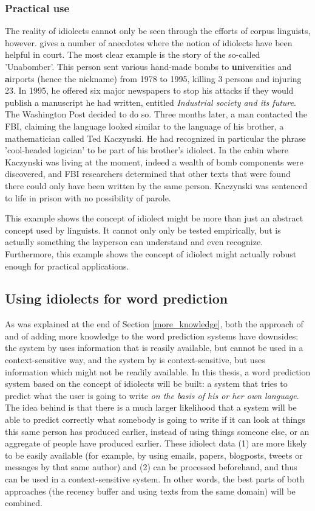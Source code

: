 \documentclass[11pt]{article}
\begin{document}
\subsubsection{Practical use}
The reality of idiolects cannot only be seen through the efforts of corpus linguists, however.  gives a number of anecdotes where the notion of idiolects have been helpful in court. The most clear example is the story of the so-called 'Unabomber'. This person sent various hand-made bombs to \textbf{un}iversities and \textbf{a}irports (hence the nickname) from 1978 to 1995, killing 3 persons and injuring 23. In 1995, he offered six major newspapers to stop his attacks if they would publish a manuscript he had written, entitled \emph{Industrial society and its future}. The Washington Post decided to do so. Three months later, a man contacted the FBI, claiming the language looked similar to the language of his brother, a mathematician called Ted Kaczynski. He had recognized in particular the phrase 'cool-headed logician' to be part of his brother's idiolect. In the cabin where Kaczynski was living at the moment, indeed a wealth of bomb components were discovered, and FBI researchers determined that other texts that were found there could only have been written by the same person. Kaczynski was sentenced to life in prison with no possibility of parole. 

This example shows the concept of idiolect might be more than just an abstract concept used by linguists. It cannot only only be tested empirically, but is actually something the layperson can understand and even recognize. Furthermore, this example shows the concept of idiolect might actually robust enough for practical applications.

\subsection{Using idiolects for word prediction} \label{linking}
As was explained at the end of Section \ref{more_knowledge}, both the approach of  and  of adding more knowledge to the word prediction systems have downsides: the system by \citeauthor{vandenbosch11} uses information that is reasily available, but cannot be used in a context-sensitive way, and the system by  is context-sensitive, but uses information which might not be readily available. In this thesis, a word prediction system based on the concept of idiolects will be built: a system that tries to predict what the user is going to write \emph{on the basis of his  or her own language}. The idea behind is that there is a much larger likelihood that a system will be able to predict correctly what somebody is going to write if it can look at things this same person has produced earlier, instead of using things someone else, or an aggregate of people have produced earlier. These idiolect data (1) are more likely to be easily available (for example, by using emails, papers, blogposts, tweets or messages by that same author) and (2) can be processed beforehand, and thus can be used in a context-sensitive system. In other words, the best parts of both approaches (the recency buffer and using texts from the same domain) will be combined.
\end{document}
